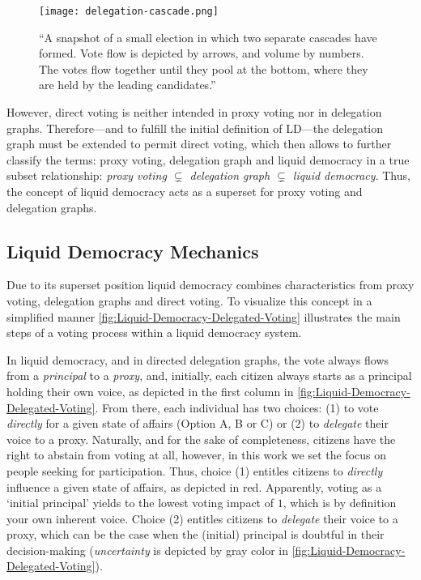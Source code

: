 \begin{figure}[H]
\centering
\texttt{[image: delegation-cascade.png]}
	\caption[Delegate cascade voting]{“A snapshot of a small election in which two separate cascades have formed. Vote flow is depicted by arrows, and volume by numbers. The votes flow together until they pool at the bottom, where they are held by the leading candidates.” \parencite{Allen2008}}
	\label{fig:Delegation-Cascade}
\end{figure}
However, direct voting is neither intended in proxy voting nor in delegation graphs. Therefore---and to fulfill the initial definition of \acrshort{LD}---the delegation graph must be extended to permit direct voting, which then allows to further classify the terms: proxy voting, delegation graph and liquid democracy in a true subset relationship: \textit{proxy voting \(\subsetneq\) delegation graph \(\subsetneq\) liquid democracy}. Thus, the concept of liquid democracy acts as a superset for proxy voting and delegation graphs. 

\subsection{Liquid Democracy Mechanics}
\label{ssec:Liquid_Democracy_Mechanics}

Due to its superset position liquid democracy combines characteristics from proxy voting, delegation graphs and direct voting. To visualize this concept in a simplified manner \autoref{fig:Liquid-Democracy-Delegated-Voting} illustrates the main steps of a voting process within a liquid democracy system.

In liquid democracy, and in directed delegation graphs, the vote always flows from a \textit{principal} to a \textit{proxy}, and, initially, each citizen always starts as a  principal holding their own voice, as depicted in the first column in \autoref{fig:Liquid-Democracy-Delegated-Voting}. From there, each individual has two choices: (1) to vote \textit{directly} for a given state of affairs (Option A, B or C) or (2) to \textit{delegate} their voice to a proxy. Naturally, and for the sake of completeness, citizens have the right to abstain from voting at all, however, in this work we set the focus on people seeking for participation. Thus, choice (1) entitles citizens to \textit{directly} influence a given state of affairs, as depicted in red. Apparently, voting as a ‘initial principal’ yields to the lowest voting impact of \(1\), which is by definition your own inherent voice. Choice (2) entitles citizens to \textit{delegate} their voice to a proxy, which can be the case when the (initial) principal is doubtful in their decision-making (\textit{uncertainty} is depicted by gray color in \autoref{fig:Liquid-Democracy-Delegated-Voting}).

